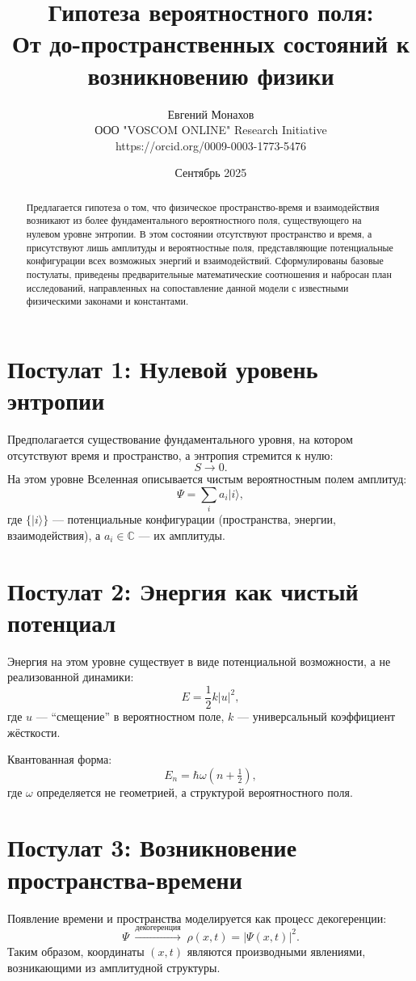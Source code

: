 \documentclass[12pt,a4paper]{article}
\title{Гипотеза вероятностного поля:\\
От до-пространственных состояний к возникновению физики}
\author{Евгений Монахов \\ ООО "VOSCOM ONLINE" Research Initiative \\ https://orcid.org/0009-0003-1773-5476}
\date{Сентябрь 2025}
\begin{document}
\maketitle

\begin{abstract}
Предлагается гипотеза о том, что физическое пространство-время и взаимодействия возникают из более фундаментального вероятностного поля, существующего на нулевом уровне энтропии. В этом состоянии отсутствуют пространство и время, а присутствуют лишь амплитуды и вероятностные поля, представляющие потенциальные конфигурации всех возможных энергий и взаимодействий. Сформулированы базовые постулаты, приведены предварительные математические соотношения и набросан план исследований, направленных на сопоставление данной модели с известными физическими законами и константами.
\end{abstract}

\section{Постулат 1: Нулевой уровень энтропии}
Предполагается существование фундаментального уровня, на котором отсутствуют время и пространство, а энтропия стремится к нулю:
\[
S \to 0.
\]
На этом уровне Вселенная описывается чистым вероятностным полем амплитуд:
\[
\Psi = \sum_{i} a_i |i\rangle ,
\]
где $\{|i\rangle\}$ — потенциальные конфигурации (пространства, энергии, взаимодействия), а $a_i \in \mathbb{C}$ — их амплитуды.

\section{Постулат 2: Энергия как чистый потенциал}
Энергия на этом уровне существует в виде потенциальной возможности, а не реализованной динамики:
\[
E = \frac{1}{2}k |u|^2 ,
\]
где $u$ — ``смещение'' в вероятностном поле, $k$ — универсальный коэффициент жёсткости.

Квантованная форма:
\[
E_n = \hbar \omega \left(n + \tfrac{1}{2}\right),
\]
где $\omega$ определяется не геометрией, а структурой вероятностного поля.

\section{Постулат 3: Возникновение пространства-времени}
Появление времени и пространства моделируется как процесс декогеренции:
\[
\Psi \;\xrightarrow{\text{декогеренция}}\; \rho(x,t) = |\Psi(x,t)|^2 .
\]
Таким образом, координаты $(x,t)$ являются производными явлениями, возникающими из амплитудной структуры.
\end{document}
